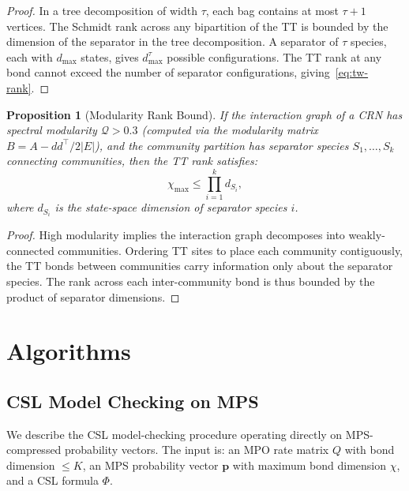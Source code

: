 \documentclass[11pt]{article}
\newtheorem{proposition}[theorem]{Proposition}
\begin{document}
\begin{proof}
In a tree decomposition of width $\tau$, each bag contains at most
$\tau + 1$ vertices.
The Schmidt rank across any bipartition of the TT is bounded by
the dimension of the separator in the tree decomposition.
A separator of $\tau$ species, each with $d_{\max}$ states, gives
$d_{\max}^\tau$ possible configurations.
The TT rank at any bond cannot exceed the number of separator
configurations, giving~\eqref{eq:tw-rank}.
\end{proof}

\begin{proposition}[Modularity Rank Bound]\label{prop:modularity}
If the interaction graph of a CRN has spectral modularity $\mathcal{Q} > 0.3$
(computed via the modularity matrix $B = A - dd^\top/2|E|$),
and the community partition has separator species
$S_1, \ldots, S_k$ connecting communities, then the TT rank satisfies:
\begin{equation}\label{eq:mod-rank}
  \chi_{\max} \leq \prod_{i=1}^{k} d_{S_i},
\end{equation}
where $d_{S_i}$ is the state-space dimension of separator species $i$.
\end{proposition}

\begin{proof}
High modularity implies the interaction graph decomposes into
weakly-connected communities.
Ordering TT sites to place each community contiguously, the TT bonds
between communities carry information only about the separator species.
The rank across each inter-community bond is thus bounded by the
product of separator dimensions.
\end{proof}

\section{Algorithms}\label{sec:algorithms}

\subsection{CSL Model Checking on MPS}\label{sec:algorithms:csl}

We describe the CSL model-checking procedure operating directly on
MPS-compressed probability vectors.
The input is: an MPO rate matrix $Q$ with bond dimension $\leq K$,
an MPS probability vector $\mathbf{p}$ with maximum bond dimension $\chi$,
and a CSL formula $\Phi$.
\end{document}
